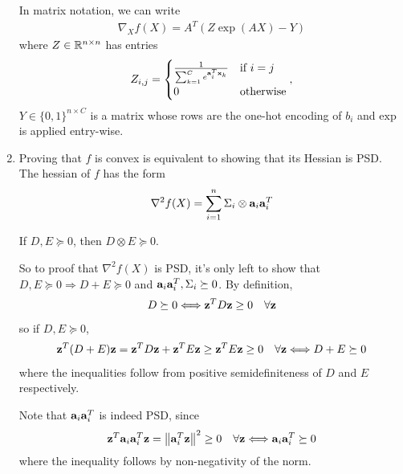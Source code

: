 \documentclass{article}
\begin{document}
\begin{enumerate}[label=1.I.\arabic*]
    In matrix notation, we can write
    \begin{align}
        \nabla_X f(X) = A^T (Z \exp{(A X)} - Y)
    \end{align}
    where $Z \in \R^{n \times n}$ has entries
    \begin{align*}
        Z_{i,j} = \begin{cases}
        \frac{1}{\sum_{k=1}^{C} e^{\aa_i^T \xx_{k}}} &\text{if }i=j \\
        0 &\text{otherwise}
        \end{cases},
    \end{align*}
    $Y\in \{0,1\}^{n\times C}$ is a matrix whose rows are the one-hot encoding of $b_i$ and $\text{exp}$ is applied entry-wise.
    \item Proving that $f$ is convex is equivalent to showing that its Hessian is PSD. The hessian of $f$ has the form
    \begin{align}
        \nabla^2 f(X) = \sum_{i=1}^{n} \Sigma_i \otimes \aa_i \aa_i^T
    \end{align}
    
    \begin{fact}
        If $D, E \succeq 0$, then $D \otimes E \succeq 0$.
        \label{fact1}
    \end{fact}
    
    So to proof that $ \nabla^2 f(X)$ is PSD, it's only left to show that $D,E \succeq 0 \Longrightarrow D+E \succeq 0$ and $\aa_i \aa_i^T, \Sigma_i \succeq 0$. By definition,
    \begin{align}
        D \succeq 0 \Longleftrightarrow \zz^T D \zz \geq 0 \quad \forall \zz
    \end{align}
    so if $D,E \succeq 0$,
    \begin{align}
        \zz^T (D + E) \zz = \zz^T D \zz + \zz^T E \zz \geq \zz^T E \zz \geq 0\quad \forall \zz \Longleftrightarrow D+E \succeq 0
        \label{eq:sum_psd}
    \end{align}
    where the inequalities follow from positive semidefiniteness of $D$ and $E$ respectively.

    Note that $\aa_i \aa_i^T$ is indeed PSD, since
    \begin{align}
        \zz^T \aa_i \aa_i^T \zz = \norm{\aa_i^T \zz}^2 \geq 0 \quad \forall \zz \Longleftrightarrow \aa_i \aa_i^T \succeq 0
    \end{align}
    where the inequality follows by non-negativity of the norm.
    

\end{enumerate}
\end{document}
